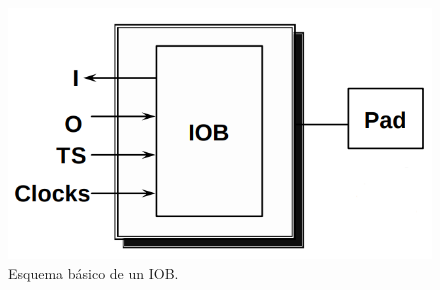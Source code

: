 \documentclass[twoside,spanish,ESP,MSc]{plantillaLabUPV}
\theoremstyle{definition}
\newcommand{\f}{FPGA }
\begin{document}




\begin{figure}[!tbh]
\centering
\includegraphics[scale=0.3]{ima/iob.png}
\caption{Esquema básico de un IOB. %
\label{iob}}
\end{figure}
\end{document}
